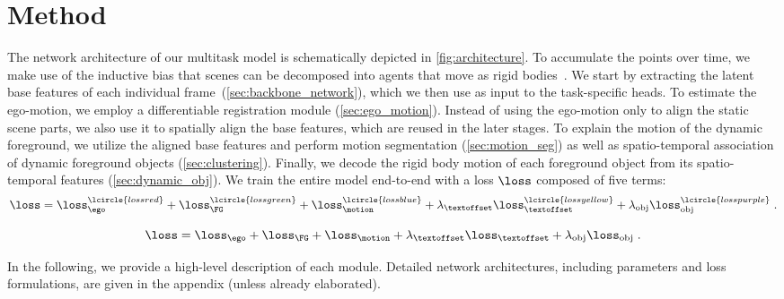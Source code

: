 \section{Method}
\label{sec:method}


The network architecture of our multitask model is schematically depicted in \cref{fig:architecture}. To accumulate the points over time, we make use of the inductive bias that scenes can be decomposed into agents that move as rigid bodies~\cite{gojcic2021weakly}. We start by extracting the latent base features of each individual frame~(\cref{sec:backbone_network}), which we then use as input to the task-specific heads. To estimate the ego-motion, we employ a differentiable registration module (\cref{sec:ego_motion}). Instead of using the ego-motion only to align the static scene parts, we also use it to spatially align the base features, which are reused in the later stages. To explain the motion of the dynamic foreground, we utilize the aligned base features and perform motion segmentation (\cref{sec:motion_seg}) as well as spatio-temporal association of dynamic foreground objects (\cref{sec:clustering}). Finally, we decode the rigid body motion of each foreground object from its spatio-temporal features (\cref{sec:dynamic_obj}). We train the entire model end-to-end with a loss $\loss$ composed of five terms: 
\begin{equation}
    \loss = \loss_\ego^\lcircle{lossred} + \loss_\FG^\lcircle{lossgreen} + \loss_\motion^\lcircle{lossblue} + \lambda_\textoffset\loss_\textoffset^\lcircle{lossyellow} + \lambda_{\text{obj}}\loss_{\text{obj}}^\lcircle{losspurple}\;.
    \label{eq:eccv_loss}
\end{equation}

\begin{equation}
    \loss = \loss_\ego + \loss_\FG + \loss_\motion + \lambda_\textoffset\loss_\textoffset + \lambda_{\text{obj}}\loss_{\text{obj}}\;.
\end{equation}

In the following, we provide a high-level description of each module. 
Detailed network architectures, including parameters and loss formulations, are given in the appendix (unless already elaborated).

